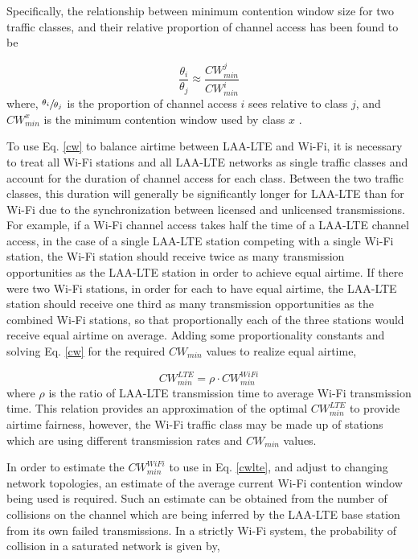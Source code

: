 Specifically, the relationship between minimum contention window size for two traffic classes, and their relative proportion of channel access has been found to be

\begin{equation}\label{cw}
\frac{\theta_i}{\theta_j} \approx \frac{CW^j_{min}}{CW^i_{min}}
\end{equation}
where, $\sfrac{\theta_i}{\theta_j}$ is the proportion of channel access $i$ sees relative to class $j$, and $CW^x_{min}$ is the minimum contention window used by class $x$ \cite{chou}\cite{yoon}.  

To use Eq. \ref{cw} to balance airtime between \mbox{LAA-LTE} and \mbox{Wi-Fi}, it is necessary to treat all \mbox{Wi-Fi} stations and all LAA-LTE networks as single traffic classes and account for the duration of channel access for each class. Between the two traffic classes, this duration will generally be significantly longer for LAA-LTE than for Wi-Fi due to the synchronization between licensed and unlicensed transmissions. For example, if a \mbox{Wi-Fi} channel access takes half the time of a \mbox{LAA-LTE} channel access, in the case of a single \mbox{LAA-LTE} station competing with a single \mbox{Wi-Fi} station, the \mbox{Wi-Fi} station should receive twice as many transmission opportunities as the \mbox{LAA-LTE} station in order to achieve equal airtime.  If there were two \mbox{Wi-Fi} stations, in order for each to have equal airtime, the \mbox{LAA-LTE} station should receive one third as many transmission opportunities as the combined \mbox{Wi-Fi} stations, so that proportionally each of the three stations would receive equal airtime on average.  Adding some proportionality constants and solving Eq. \ref{cw} for the required $CW_{min}$ values to realize equal airtime,

\begin{equation}\label{cwlte}
CW^{LTE}_{min} = \rho\cdot{CW^{WiFi}_{min}}
\end{equation}
where $\rho$ is the ratio of \mbox{LAA-LTE} transmission time to average \mbox{Wi-Fi} transmission time.  This relation provides an approximation of the optimal $CW^{LTE}_{min}$ to provide airtime fairness, however, the \mbox{Wi-Fi} traffic class may be made up of stations which are using different transmission rates and $CW_{min}$ values.  

In order to estimate the $CW^{WiFi}_{min}$ to use in Eq. \ref{cwlte}, and adjust to changing network topologies, an estimate of the average current Wi-Fi contention window being used is required.  Such an estimate can be obtained from the number of collisions on the channel which are being inferred by the LAA-LTE base station from its own failed transmissions.  In a strictly \mbox{Wi-Fi} system, the probability of collision in a saturated network is given by, 

